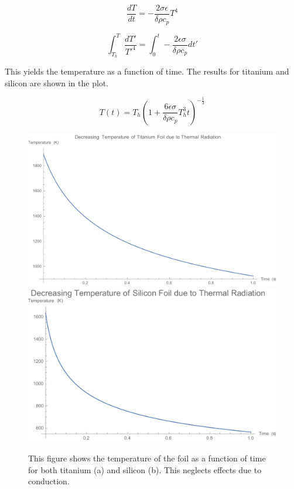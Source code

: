 \documentclass[12pt]{article}
\begin{document}
\begin{equation}
\frac{dT}{dt}=-\frac{2 \sigma \epsilon}{\delta \rho c_p} T^4
\end{equation}

\begin{equation}
\int_{T_h}^{T} \frac{dT'}{T'^4}=\int_0^t -\frac{2 \epsilon \sigma}{\delta \rho c_p} dt'
\end{equation}

This yields the temperature as a function of time. The results for titanium and silicon are shown in the plot.

\begin{equation}
T(t)=T_h (1+\frac{6 \epsilon \sigma}{\delta \rho c_p} T_{h}^{3} t)^{-\frac{1}{3}}
\end{equation}

\begin{figure}
\begin{center}
\includegraphics[scale=0.5]{figures/TemperatureTi.PDF}
\includegraphics[scale=0.5]{figures/TemperatureSi.PDF}
\caption{This figure shows the temperature of the foil as a function of time for both titanium (a) and silicon (b). This neglects effects due to conduction.}
\end{center}
\end{figure}
\end{document}
